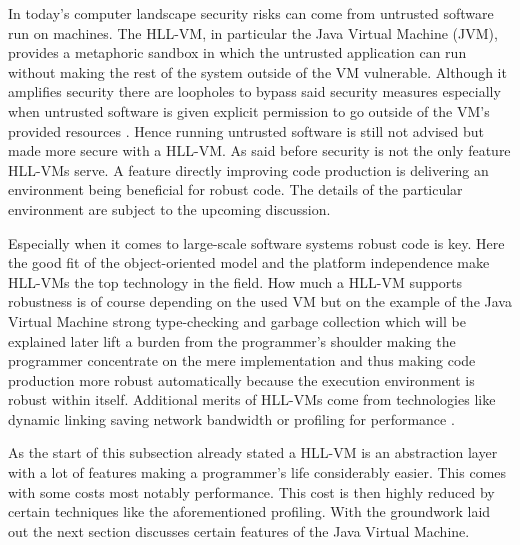 In today's computer landscape security risks can come from untrusted software run on machines. The HLL-VM, in particular the Java Virtual Machine (JVM),  provides a metaphoric sandbox in which the untrusted application can run without making the rest of the system outside of the VM vulnerable. Although it amplifies security there are loopholes to bypass said security measures especially when untrusted software is given explicit permission to go outside of the VM's provided resources \cite{Smith, Lindholm}. Hence running untrusted software is still not advised but made more secure with a HLL-VM. As said before security is not the only feature HLL-VMs serve. A feature directly improving code production is delivering an environment being beneficial for robust code. The details of the particular environment are subject to the upcoming discussion.

Especially when it comes to large-scale software systems robust code is key. Here the good fit of the object-oriented model and the platform independence make HLL-VMs the top technology in the field. How much a HLL-VM supports robustness is of course depending on the used VM but on the example of the Java Virtual Machine strong type-checking and garbage collection which will be explained later lift a burden from the programmer's shoulder making the programmer concentrate on the mere implementation and thus making code production more robust automatically because the execution environment is robust within itself. Additional merits of HLL-VMs come from technologies like dynamic linking saving network bandwidth or profiling for performance \cite{Smith}.

As the start of this subsection already stated a HLL-VM is an abstraction layer with a lot of features making a programmer's life considerably easier. This comes with some costs most notably performance. This cost is then highly reduced by certain techniques like the aforementioned profiling. With the groundwork laid out the next section discusses certain features of the Java Virtual Machine.

